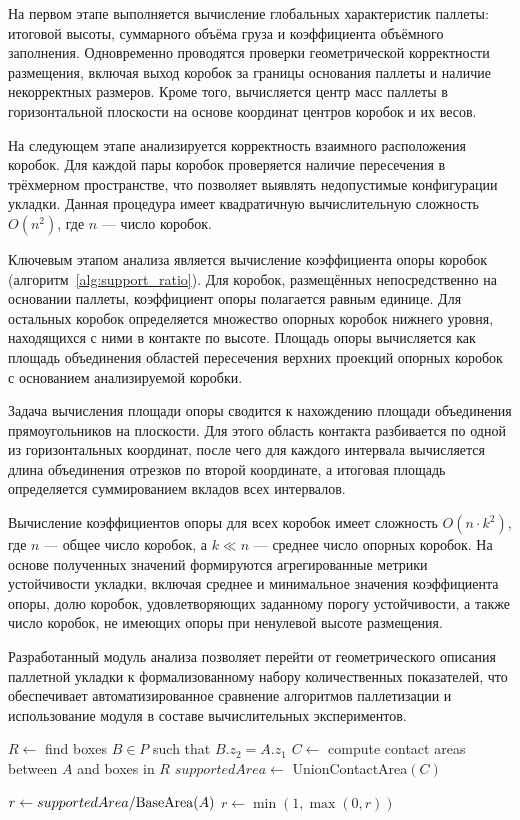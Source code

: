 На первом этапе выполняется вычисление глобальных характеристик паллеты: итоговой высоты, суммарного объёма груза и коэффициента объёмного заполнения. Одновременно проводятся проверки геометрической корректности размещения, включая выход коробок за границы основания паллеты и наличие некорректных размеров. Кроме того, вычисляется центр масс паллеты в горизонтальной плоскости на основе координат центров коробок и их весов.

На следующем этапе анализируется корректность взаимного расположения коробок. Для каждой пары коробок проверяется наличие пересечения в трёхмерном пространстве, что позволяет выявлять недопустимые конфигурации укладки. Данная процедура имеет квадратичную вычислительную сложность $O(n^2)$, где $n$ — число коробок.

Ключевым этапом анализа является вычисление коэффициента опоры коробок (алгоритм~\ref{alg:support_ratio}). Для коробок, размещённых непосредственно на основании паллеты, коэффициент опоры полагается равным единице. Для остальных коробок определяется множество опорных коробок нижнего уровня, находящихся с ними в контакте по высоте. Площадь опоры вычисляется как площадь объединения областей пересечения верхних проекций опорных коробок с основанием анализируемой коробки.

Задача вычисления площади опоры сводится к нахождению площади объединения прямоугольников на плоскости. Для этого область контакта разбивается по одной из горизонтальных координат, после чего для каждого интервала вычисляется длина объединения отрезков по второй координате, а итоговая площадь определяется суммированием вкладов всех интервалов.

Вычисление коэффициентов опоры для всех коробок имеет сложность $O(n \cdot k^2)$, где $n$ — общее число коробок, а $k \ll n$ — среднее число опорных коробок. На основе полученных значений формируются агрегированные метрики устойчивости укладки, включая среднее и минимальное значения коэффициента опоры, долю коробок, удовлетворяющих заданному порогу устойчивости, а также число коробок, не имеющих опоры при ненулевой высоте размещения.

Разработанный модуль анализа позволяет перейти от геометрического описания паллетной укладки к формализованному набору количественных показателей, что обеспечивает автоматизированное сравнение алгоритмов паллетизации и использование модуля в составе вычислительных экспериментов.

\begin{algorithm}[H]
\caption{Support ratio computation for a box}
\label{alg:support_ratio}


$R \leftarrow$ find boxes $B \in P$ such that $B.z_2 = A.z_1$\;
$C \leftarrow$ compute contact areas between $A$ and boxes in $R$\;
$supportedArea \leftarrow$ \textnormal{UnionContactArea}$(C)$\;

$r \leftarrow supportedArea/\textnormal{BaseArea}(A)$\;
$r \leftarrow \min(1,\max(0,r))$\;

\;
\end{algorithm}

